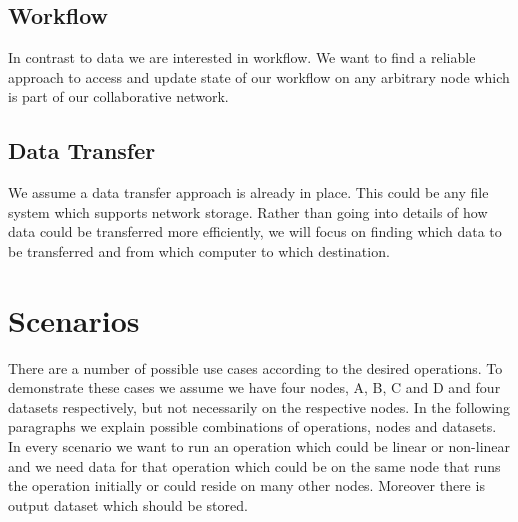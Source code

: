 \subsection{Workflow}
In contrast to data we are interested in workflow. We want to find a reliable approach to access and update 
state of our workflow on any arbitrary node which is part of our collaborative network.

\subsection{Data Transfer}
We assume a data transfer approach is already in place. This could be any file system which supports 
network storage. Rather than going into details of how data could be transferred more efficiently, we will
focus on finding which data to be transferred and from which computer to which destination.



\section{Scenarios}
There are a number of possible use cases according to the desired operations. To demonstrate these cases we assume
we have four nodes, A, B, C and D and four datasets respectively, but not necessarily on the respective nodes.
In the following paragraphs we explain possible
combinations of operations, nodes and datasets. In every scenario we want to run an operation which could be
linear or non-linear and we need data for that operation which could be on the same node that runs the operation
initially or could reside on many other nodes. Moreover there is output dataset which should be stored.

